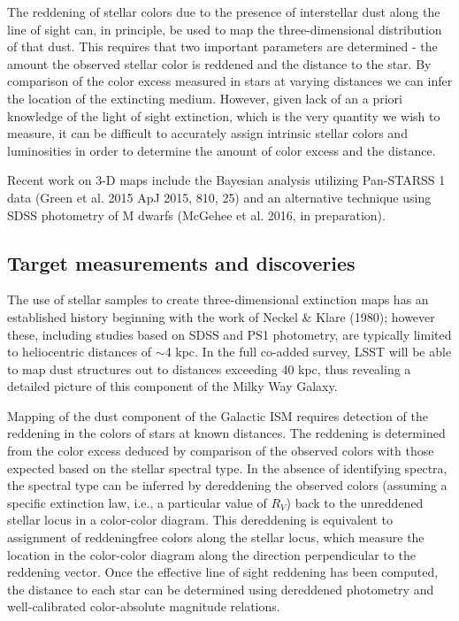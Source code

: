 The reddening of stellar colors due to the presence of interstellar dust along the line of sight can,
in principle, be used to map the three-dimensional distribution of that dust. This requires that
two important parameters are determined - the amount the observed stellar color is reddened and
the distance to the star. By comparison of the color excess measured in stars at varying distances
we can infer the location of the extincting medium. However, given lack of an a priori knowledge
of the light of sight extinction, which is the very quantity we wish to measure, it can be difficult
to accurately assign intrinsic stellar colors and luminosities in order to determine the amount of
color excess and the distance. 

Recent work on 3-D maps include the Bayesian analysis utilizing Pan-STARSS 1 data 
(Green et al. 2015 ApJ 2015, 810, 25) and an alternative technique using SDSS photometry of 
M dwarfs (McGehee et al. 2016, in preparation). 


\subsection{Target measurements and discoveries}
\label{sec:\secname:targets}

The use of stellar samples to create three-dimensional extinction maps has an established history
beginning with the work of Neckel \& Klare (1980); however these, including studies based on SDSS and
PS1 photometry, are typically limited to heliocentric distances of $\sim$4 kpc. In the full co-added survey,
LSST will be able to map dust structures out to distances exceeding 40 kpc, thus revealing a
detailed picture of this component of the Milky Way Galaxy.

Mapping of the dust component of the Galactic ISM requires detection of the reddening in the
colors of stars at known distances. The reddening is determined from the color excess deduced
by comparison of the observed colors with those expected based on the stellar spectral type. In
the absence of identifying spectra, the spectral type can be inferred by dereddening the observed
colors (assuming a specific extinction law, i.e., a particular value of $R_V$) back to the unreddened
stellar locus in a color-color diagram. This dereddening is equivalent to assignment of reddeningfree
colors along the stellar locus, which measure the location in the color-color diagram along
the direction perpendicular to the reddening vector. Once the effective line of sight reddening has
been computed, the distance to each star can be determined using dereddened photometry and
well-calibrated color-absolute magnitude relations.

